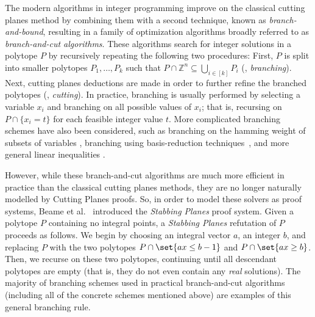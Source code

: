 \documentclass{toc}
\begin{document}
The modern algorithms in integer programming improve on the classical cutting planes method by combining them with a second technique, known as \emph{branch-and-bound}, resulting in a family of optimization algorithms broadly referred to as \emph{branch-and-cut algorithms}. 
These algorithms search for integer solutions in a polytope $P$ by recursively repeating the following two procedures: First, $P$ is split into smaller polytopes $P_1,\ldots, P_k$  such that $P \cap \mathbb{Z}^n \subseteq \bigcup_{i\in [k]} P_i$ (\ie, \emph{branching}). 
Next, cutting planes deductions are made in order to further refine the branched polytopes (\ie, \emph{cutting}). 
In practice, branching is usually performed by selecting a variable $x_i$ and branching on all possible values of $x_i$; that is, recursing on $P \cap \{x_i = t\}$ for each feasible integer value $t$.
More complicated branching schemes have also been considered, such as branching on the hamming weight of subsets of variables \cite{FischettiL03}, branching using basis-reduction techniques~\cite{AardalL04,KrishnamoorthyP09,AardalBHLS00}, and more general linear inequalities \cite{OwenM01,mahajanRT09,KaramanovC11}. 

However, while these branch-and-cut algorithms are much more efficient in practice than the classical cutting planes methods, they are no longer naturally modelled by Cutting Planes proofs.
So, in order to model these solvers as proof systems, Beame et al.~\cite{BeameFIKPPR18} introduced the \emph{Stabbing Planes} proof system.
%
%
Given a polytope $P$ containing no integral points, a \emph{Stabbing Planes} refutation of $P$ proceeds as follows.
We begin by choosing an integral vector $a$, an integer $b$, and replacing $P$ with the two polytopes $P \cap \set{ax \leq b-1}$ and $P \cap \set{ax \geq b}$.
Then, we recurse on these two polytopes, continuing until all descendant polytopes are empty (that is, they do not even contain any \emph{real} solutions).
The majority of branching schemes used in practical branch-and-cut algorithms (including all of the concrete schemes mentioned above) are examples of this general branching rule.
\end{document}
